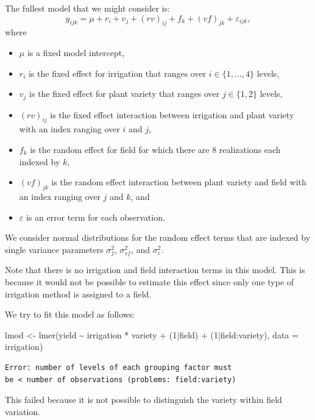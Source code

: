 \documentclass[
  ignorenonframetext,
]{beamer}
\newenvironment{Shaded}{\begin{snugshade}}{\end{snugshade}}
\newcommand{\AttributeTok}[1]{\textcolor[rgb]{0.77,0.63,0.00}{#1}}
\newcommand{\DecValTok}[1]{\textcolor[rgb]{0.00,0.00,0.81}{#1}}
\newcommand{\FunctionTok}[1]{\textcolor[rgb]{0.00,0.00,0.00}{#1}}
\newcommand{\NormalTok}[1]{#1}
\newcommand{\OtherTok}[1]{\textcolor[rgb]{0.56,0.35,0.01}{#1}}
\newcommand{\SpecialCharTok}[1]{\textcolor[rgb]{0.00,0.00,0.00}{#1}}
\begin{document}
\begin{frame}{}
\protect\hypertarget{section-2}{}
The fullest model that we might consider is: \[
  y_{ijk} = \mu + r_i + v_j + (rv)_{ij} + f_k + (vf)_{jk} + \varepsilon_{ijk},
\] where

\begin{itemize}
\item $\mu$ is a fixed model intercept,
\item $r_i$ is the fixed effect for irrigation that ranges over $i \in \{1,\ldots,4\}$ levels,
\item $v_j$ is the fixed effect for plant variety that ranges over $j \in \{1,2\}$ levels,
\item $(rv)_{ij}$ is the fixed effect interaction between irrigation and plant variety with an index ranging over $i$ and $j$,
\item $f_k$ is the random effect for field for which there are 8 realizations each indexed by $k$,
\item $(vf)_{jk}$ is the random effect interaction between plant variety and field with an index ranging over $j$ and $k$, and 
\item $\varepsilon$ is an error term for each observation.
\end{itemize}
\end{frame}

\begin{frame}[fragile]{}
\protect\hypertarget{section-3}{}
We consider normal distributions for the random effect terms that are
indexed by single variance parameters \(\sigma^2_f\), \(\sigma^2_{vf}\),
and \(\sigma^2_\varepsilon\).

Note that there is no irrigation and field interaction terms in this
model. This is because it would not be possible to estimate this effect
since only one type of irrigation method is assigned to a field.

We try to fit this model as follows:

\vspace{12pt}
\small

\begin{Shaded}
\begin{Highlighting}[]
\NormalTok{lmod }\OtherTok{\textless{}{-}} \FunctionTok{lmer}\NormalTok{(yield }\SpecialCharTok{\textasciitilde{}}\NormalTok{ irrigation }\SpecialCharTok{*}\NormalTok{ variety }\SpecialCharTok{+}\NormalTok{ (}\DecValTok{1}\SpecialCharTok{|}\NormalTok{field) }\SpecialCharTok{+} 
\NormalTok{             (}\DecValTok{1}\SpecialCharTok{|}\NormalTok{field}\SpecialCharTok{:}\NormalTok{variety), }\AttributeTok{data =}\NormalTok{ irrigation)}
\end{Highlighting}
\end{Shaded}

\begin{verbatim}
Error: number of levels of each grouping factor must 
be < number of observations (problems: field:variety)
\end{verbatim}

\vspace{12pt}
\normalsize

This failed because it is not possible to distinguish the variety within
field variation.
\end{frame}
\end{document}
